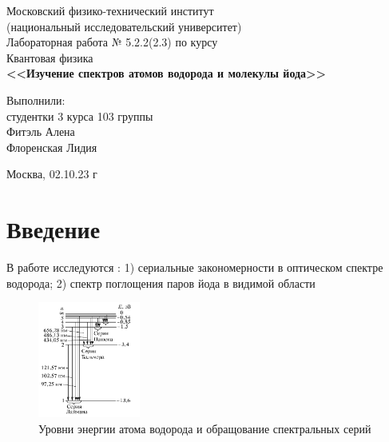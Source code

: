 \documentclass{article}
\begin{document}
\begin{titlepage}
     \begin{center}
     \large Московский физико-технический институт\\
    (национальный исследовательский университет)\\
    \vspace{4cm}
    \Large Лабораторная работа № 5.2.2(2.3) по курсу \\  Квантовая физика\\
    \vspace{4cm}
    \textbf{\Huge <<Изучение спектров атомов водорода и молекулы йода>>}\\
     \end{center}
    \vspace{5cm}
    {\par \raggedleft \large Выполнили:\\ студентки 3 курса
    103 группы\\ Фитэль Алена \\Флоренская Лидия \par}
    \vspace{3cm}
    \begin{center}
        Москва, 02.10.23 г
    \end{center}
\end{titlepage}
\section*{Введение} \label{sec:Intro}



В работе исследуются : 1) сериальные закономерности в оптическом спектре водорода; 2) спектр поглощения паров йода в видимой области




\begin{figure}
\begin{center}
\includegraphics[width=0.3\textwidth]{Screenshot 2023-10-07 at 5.04.51 PM.png}
\caption{Уровни энергии атома водорода и обращование спектральных серий}
\label{vodorod}
\end{center}
\end{figure}
\end{document}
